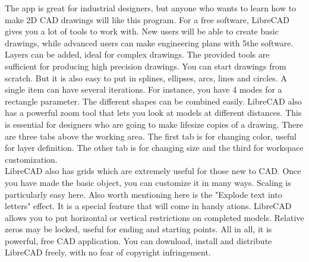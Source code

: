 The  app  is  great  for  industrial  designers,  but  anyone  who  wants  to  learn  how  to  make  2D  CAD
drawings  will  like  this  program.  For  a  free  software,  LibreCAD  gives  you  a  lot  of  tools  to  work  with.
New  users  will  be  able  to  create  basic drawings, while advanced users can make engineering plans with
5the  software.  Layers  can  be  added,  ideal  for  complex   drawings.  The  provided  tools  are  sufficient  for
producing  high  precision  drawings.  You  can  start  drawings  from  scratch.  But  it  is  also  easy  to  put  in
splines,  ellipses,  arcs,  lines  and   circles.  A  single  item  can  have  several iterations. For instance, you have
4 modes for a rectangle parameter. The different shapes can be combined easily.
LibreCAD  also  has  a  powerful  zoom  tool  that  lets  you  look  at  models  at  different  distances.  This  is
essential  for  designers  who  are  going  to  make  life­size  copies  of  a  drawing.  There are three tabs above
the  working  area.   The  first  tab  is  for  changing  color,  useful  for  layer  definition.   The  other  tab  is  for
changing size and the third for workspace customization.\\


LibreCAD also has grids which are extremely useful for those new to CAD. Once you have  made the
basic  object,  you can customize it in many ways. Scaling is particularly easy here. Also worth mentioning
here  is  the  "Explode  text  into  letters"  effect.   It  is  a  special  feature  that  will come in handy ations.
LibreCAD  allows  you  to  put  horizontal  or vertical restrictions on completed models. Relative zeros may
be  locked,  useful  for   ending  and  starting  points.  All  in  all,  it is powerful, free CAD application. You can
download, install and distribute LibreCAD freely, with no fear of copyright infringement.
